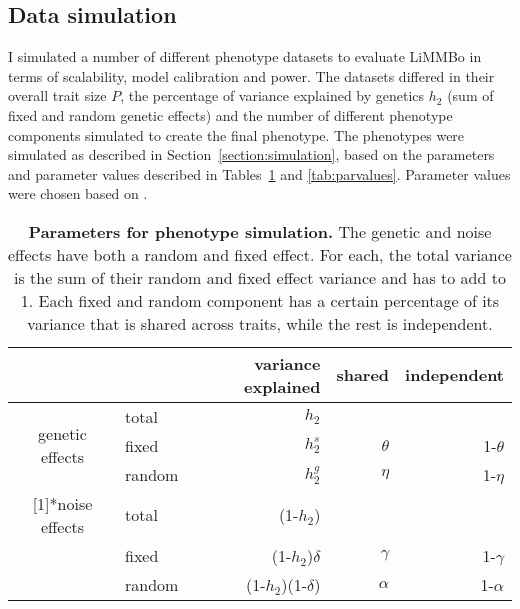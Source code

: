 \subsection{Data simulation}
I simulated a number of different phenotype datasets to evaluate LiMMBo in terms of scalability, model calibration and power. The datasets differed in their overall trait size \(P\), the percentage of variance explained by genetics \(h_2\) (sum of fixed and random genetic effects) and the number of different phenotype components simulated to create the final phenotype. The phenotypes were simulated as described in Section~\ref{section:simulation}, based on the parameters and parameter values described in Tables~\ref{tab:pardescription} and \ref{tab:parvalues}. Parameter values were chosen based on .

\begin{table}[htbp]
  \centering
  \caption{\textbf{Parameters for phenotype simulation.} The genetic and noise effects have both a random and fixed effect. For each, the total variance is the sum of their random and fixed effect variance and has to add to 1. Each fixed and random component has a certain percentage of its variance that is shared across traits, while the rest is independent.}
    \begin{tabular}{clrrr}
    \toprule
          &       & variance explained & shared & independent \\
    \midrule
    \multirow{3}[1]{*}{genetic effects} & total & \(h_2\) &       &  \\
          & fixed & \(h_2^s\) & \(\theta\) & 1-\(\theta\) \\
          & random & \(h_2^g\) & \(\eta\) & 1-\(\eta\) \\
   \addlinespace[1.5ex]
    \multirow{3}[1]{*}{noise effects} & total & (1-\(h_2\)) &       &  \\
          & fixed & (1-\(h_2\))\(\delta\) & \(\gamma\) & 1-\(\gamma\) \\
          & random & (1-\(h_2\))(1-\(\delta\)) & \(\alpha\) & 1-\(\alpha\) \\
    \bottomrule
    \end{tabular}%
  \label{tab:pardescription}%
\end{table}%

